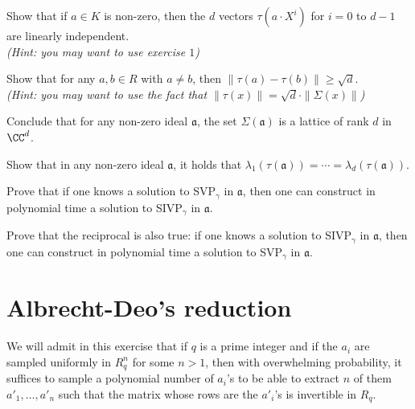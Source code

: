 \documentclass[11pt]{exam}
\theoremstyle{definition}
\begin{document}
\begin{questions}
\question Show that if $a \in K$ is non-zero, then the $d$ vectors $\tau(a \cdot X^i)$ for $i = 0$ to ${d-1}$ are linearly independent. \\
\textit{\color{gray}(Hint: you may want to use exercise $1$)}

\question Show that for any $a,b \in R$ with $a \neq b$, then $\|\tau(a) - \tau(b)\| \geq \sqrt{d}$. \\
\textit{\color{gray}(Hint: you may want to use the fact that $\|\tau(x)\| = \sqrt{d} \cdot \|\Sigma(x)\|$)}

\question Conclude that for any non-zero ideal $\mathfrak{a}$, the set $\Sigma(\mathfrak{a})$ is a lattice of rank $d$ in $\CC^d$.

\question Show that in any non-zero ideal $\mathfrak{a}$, it holds that $\lambda_1(\tau(\mathfrak{a})) = \cdots = \lambda_d(\tau(\mathfrak{a}))$.

\question Prove that if one knows a solution to SVP$_\gamma$ in $\mathfrak{a}$, then one can construct in polynomial time a solution to SIVP$_\gamma$ in $\mathfrak{a}$.


\question Prove that the reciprocal is also true: if one knows a solution to SIVP$_\gamma$ in $\mathfrak{a}$, then one can construct in polynomial time a solution to SVP$_\gamma$ in $\mathfrak{a}$.

\end{questions}

\section{Albrecht-Deo's reduction}

We will admit in this exercise that if $q$ is a prime integer and if the $a_i$ are sampled uniformly in $R_q^n$ for some $n > 1$, then with overwhelming probability, it suffices to sample a polynomial number of $a_i$'s to be able to extract $n$ of them $a'_1, \dots, a'_n$ such that the matrix whose rows are the $a'_i$'s is invertible in $R_q$.
\end{document}
